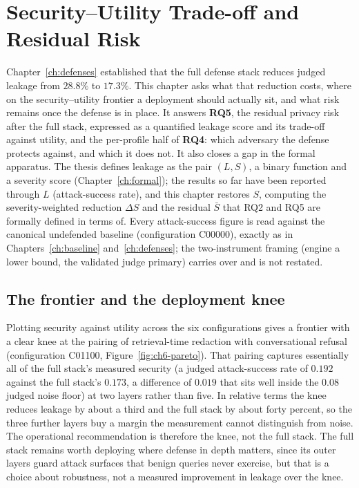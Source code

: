 \chapter{Security--Utility Trade-off and Residual Risk}
\label{ch:tradeoff}

Chapter~\ref{ch:defenses} established that the full defense stack reduces judged leakage from
$28.8\%$ to $17.3\%$. This chapter asks what that reduction costs, where on the
security--utility frontier a deployment should actually sit, and what risk remains once the
defense is in place. It answers \textbf{RQ5}, the residual privacy risk after the full
stack, expressed as a quantified leakage score and its trade-off against utility, and the
per-profile half of \textbf{RQ4}: which adversary the defense protects against, and which it
does not. It also closes a gap in the formal apparatus. The thesis defines leakage as the pair
$(L,S)$, a binary function and a severity score (Chapter~\ref{ch:formal}); the results so far
have been reported through $L$ (attack-success rate), and this chapter restores $S$, computing
the severity-weighted reduction $\Delta S$ and the residual $\bar{S}$ that RQ2 and RQ5 are
formally defined in terms of. Every attack-success figure is read against the canonical
undefended baseline (configuration C00000), exactly as in
Chapters~\ref{ch:baseline} and~\ref{ch:defenses}; the two-instrument framing (engine a lower
bound, the validated judge primary) carries over and is not restated.

\section{The frontier and the deployment knee}
\label{sec:ch6-knee}

Plotting security against utility across the six configurations gives a frontier with a clear
knee at the pairing of retrieval-time redaction with conversational refusal (configuration
C01100, Figure~\ref{fig:ch6-pareto}). That pairing captures essentially all of the full stack's
measured security (a judged attack-success rate of $0.192$ against the full stack's $0.173$,
a difference of $0.019$ that sits well inside the $0.08$ judged noise floor) at two layers
rather than five. In relative terms the knee reduces leakage by about a third and the full
stack by about forty percent, so the three further layers buy a margin the measurement cannot
distinguish from noise. The operational recommendation is therefore the knee, not the full
stack. The full stack remains worth deploying where defense in depth matters, since its outer
layers guard attack surfaces that benign queries never exercise, but that is a choice about
robustness, not a measured improvement in leakage over the knee.

